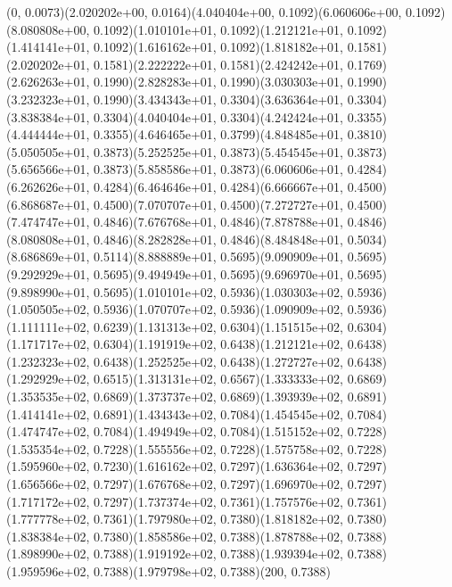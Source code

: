 (0, 0.0073)(2.020202e+00, 0.0164)(4.040404e+00, 0.1092)(6.060606e+00, 0.1092)(8.080808e+00, 0.1092)(1.010101e+01, 0.1092)(1.212121e+01, 0.1092)(1.414141e+01, 0.1092)(1.616162e+01, 0.1092)(1.818182e+01, 0.1581)(2.020202e+01, 0.1581)(2.222222e+01, 0.1581)(2.424242e+01, 0.1769)(2.626263e+01, 0.1990)(2.828283e+01, 0.1990)(3.030303e+01, 0.1990)(3.232323e+01, 0.1990)(3.434343e+01, 0.3304)(3.636364e+01, 0.3304)(3.838384e+01, 0.3304)(4.040404e+01, 0.3304)(4.242424e+01, 0.3355)(4.444444e+01, 0.3355)(4.646465e+01, 0.3799)(4.848485e+01, 0.3810)(5.050505e+01, 0.3873)(5.252525e+01, 0.3873)(5.454545e+01, 0.3873)(5.656566e+01, 0.3873)(5.858586e+01, 0.3873)(6.060606e+01, 0.4284)(6.262626e+01, 0.4284)(6.464646e+01, 0.4284)(6.666667e+01, 0.4500)(6.868687e+01, 0.4500)(7.070707e+01, 0.4500)(7.272727e+01, 0.4500)(7.474747e+01, 0.4846)(7.676768e+01, 0.4846)(7.878788e+01, 0.4846)(8.080808e+01, 0.4846)(8.282828e+01, 0.4846)(8.484848e+01, 0.5034)(8.686869e+01, 0.5114)(8.888889e+01, 0.5695)(9.090909e+01, 0.5695)(9.292929e+01, 0.5695)(9.494949e+01, 0.5695)(9.696970e+01, 0.5695)(9.898990e+01, 0.5695)(1.010101e+02, 0.5936)(1.030303e+02, 0.5936)(1.050505e+02, 0.5936)(1.070707e+02, 0.5936)(1.090909e+02, 0.5936)(1.111111e+02, 0.6239)(1.131313e+02, 0.6304)(1.151515e+02, 0.6304)(1.171717e+02, 0.6304)(1.191919e+02, 0.6438)(1.212121e+02, 0.6438)(1.232323e+02, 0.6438)(1.252525e+02, 0.6438)(1.272727e+02, 0.6438)(1.292929e+02, 0.6515)(1.313131e+02, 0.6567)(1.333333e+02, 0.6869)(1.353535e+02, 0.6869)(1.373737e+02, 0.6869)(1.393939e+02, 0.6891)(1.414141e+02, 0.6891)(1.434343e+02, 0.7084)(1.454545e+02, 0.7084)(1.474747e+02, 0.7084)(1.494949e+02, 0.7084)(1.515152e+02, 0.7228)(1.535354e+02, 0.7228)(1.555556e+02, 0.7228)(1.575758e+02, 0.7228)(1.595960e+02, 0.7230)(1.616162e+02, 0.7297)(1.636364e+02, 0.7297)(1.656566e+02, 0.7297)(1.676768e+02, 0.7297)(1.696970e+02, 0.7297)(1.717172e+02, 0.7297)(1.737374e+02, 0.7361)(1.757576e+02, 0.7361)(1.777778e+02, 0.7361)(1.797980e+02, 0.7380)(1.818182e+02, 0.7380)(1.838384e+02, 0.7380)(1.858586e+02, 0.7388)(1.878788e+02, 0.7388)(1.898990e+02, 0.7388)(1.919192e+02, 0.7388)(1.939394e+02, 0.7388)(1.959596e+02, 0.7388)(1.979798e+02, 0.7388)(200, 0.7388)